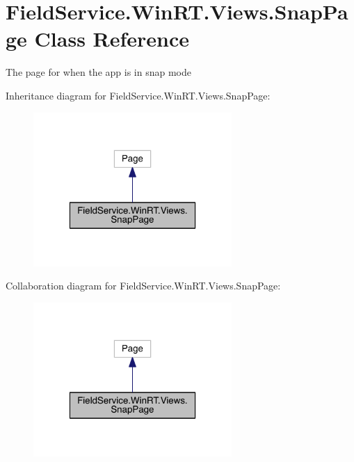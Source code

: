 \hypertarget{class_field_service_1_1_win_r_t_1_1_views_1_1_snap_page}{\section{Field\+Service.\+Win\+R\+T.\+Views.\+Snap\+Page Class Reference}
\label{class_field_service_1_1_win_r_t_1_1_views_1_1_snap_page}
}


The page for when the app is in snap mode  




Inheritance diagram for Field\+Service.\+Win\+R\+T.\+Views.\+Snap\+Page\+:
\nopagebreak
\begin{figure}[H]
\begin{center}
\leavevmode
\includegraphics[width=214pt]{class_field_service_1_1_win_r_t_1_1_views_1_1_snap_page__inherit__graph}
\end{center}
\end{figure}


Collaboration diagram for Field\+Service.\+Win\+R\+T.\+Views.\+Snap\+Page\+:
\nopagebreak
\begin{figure}[H]
\begin{center}
\leavevmode
\includegraphics[width=214pt]{class_field_service_1_1_win_r_t_1_1_views_1_1_snap_page__coll__graph}
\end{center}
\end{figure}
